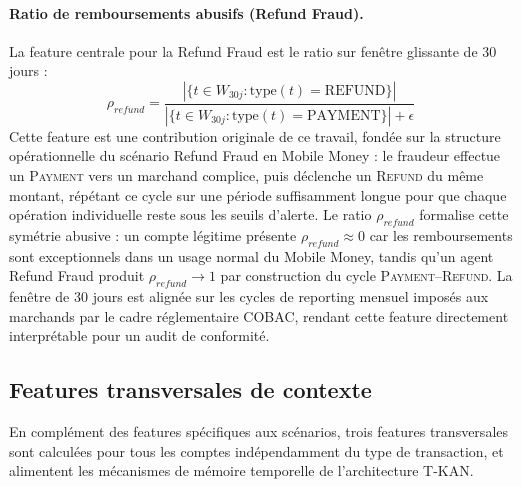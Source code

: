 \documentclass[11pt,a4paper,oneside]{report}
\theoremstyle{definition}
\theoremstyle{remark}
\begin{document}
\paragraph{Ratio de remboursements abusifs (Refund Fraud).}
La feature centrale pour la Refund Fraud est le ratio sur fenêtre glissante de 30 jours :
\begin{equation}
    \rho_{refund} = \frac{|\{t \in W_{30j} : \text{type}(t) = \text{REFUND}\}|}{|\{t \in W_{30j} : \text{type}(t) = \text{PAYMENT}\}| + \epsilon}
\end{equation}
Cette feature est une contribution originale de ce travail, fondée sur la structure opérationnelle du scénario Refund Fraud en Mobile Money : le fraudeur effectue un \textsc{Payment} vers un marchand complice, puis déclenche un \textsc{Refund} du même montant, répétant ce cycle sur une période suffisamment longue pour que chaque opération individuelle reste sous les seuils d'alerte. Le ratio $\rho_{refund}$ formalise cette symétrie abusive : un compte légitime présente $\rho_{refund} \approx 0$ car les remboursements sont exceptionnels dans un usage normal du Mobile Money, tandis qu'un agent Refund Fraud produit $\rho_{refund} \rightarrow 1$ par construction du cycle \textsc{Payment}--\textsc{Refund}. La fenêtre de 30 jours est alignée sur les cycles de reporting mensuel imposés aux marchands par le cadre réglementaire COBAC, rendant cette feature directement interprétable pour un audit de conformité.

\subsection{Features transversales de contexte}

En complément des features spécifiques aux scénarios, trois features transversales sont calculées pour tous les comptes indépendamment du type de transaction, et alimentent les mécanismes de mémoire temporelle de l'architecture T-KAN.
\end{document}
